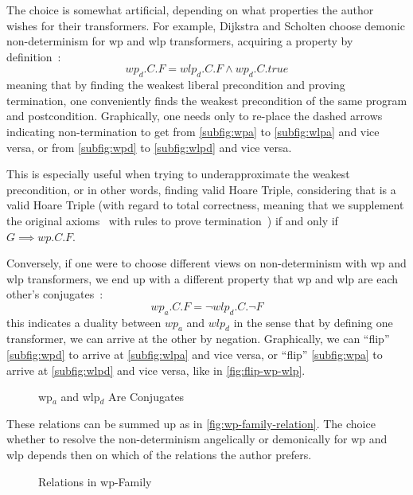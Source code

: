 The choice is somewhat artificial, depending on what properties the author wishes for their transformers.
For example, Dijkstra and Scholten choose demonic non-determinism for wp and wlp transformers, acquiring a property by definition~\cite{dijkstra90}: 
$$wp_d.C.F = wlp_d.C.F \wedge wp_d.C.true $$
meaning that by finding the weakest liberal precondition and proving termination, one conveniently finds the weakest precondition of the same program and postcondition. 
Graphically, one needs only to re-place the dashed arrows indicating non-termination to get from \autoref{subfig:wpa} to \autoref{subfig:wlpa} and vice versa, or from  \autoref{subfig:wpd} to \autoref{subfig:wlpd} and vice versa. 

This is especially useful when trying to underapproximate the weakest precondition, %
or in other words, finding valid Hoare Triple, considering that  is a valid Hoare Triple (with regard to total correctness, meaning that we supplement the original axioms~\cite{hoare69} with rules to prove termination~\cite{manna74}) if and only if $G\implies wp.C.F$.

Conversely, if one were to choose different views on non-determinism with wp and wlp transformers, we end up with a different property that wp and wlp are each other's conjugates~\cite{dijkstra76,zhang22}: 
$$ wp_a.C.F = \neg wlp_d.C.\neg F $$ 
this indicates a duality between $wp_a$ and $wlp_d$ in the sense that by defining one transformer, we can arrive at the other by negation. 
Graphically, we can ``flip'' \autoref{subfig:wpd} to arrive at \autoref{subfig:wlpa} and vice versa, or ``flip'' \autoref{subfig:wpa} to arrive at \autoref{subfig:wlpd} and vice versa, like in \autoref{fig:flip-wp-wlp}. 
\begin{figure}[ht]
	\centering
	
	\caption{wp$_a$ and wlp$_d$ Are Conjugates}
	\label{fig:flip-wp-wlp}
\end{figure}

These relations can be summed up as in \autoref{fig:wp-family-relation}. 
The choice whether to resolve the non-determinism angelically or demonically for wp and wlp depends then on which of the relations the author prefers. 
\begin{figure}[ht]
	\centering
	
	\caption{Relations in wp-Family}
	\label{fig:wp-family-relation}
\end{figure}

